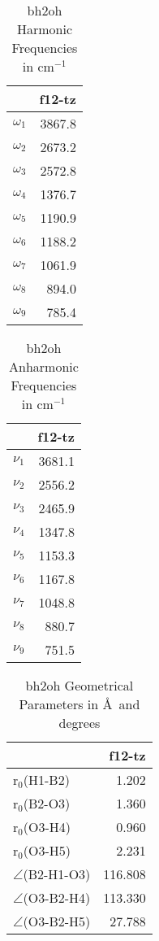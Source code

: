 \begin{table}
\centering
\caption{bh2oh Harmonic Frequencies in cm$^{-1}$}
\label{bh2oh_harm}
\begin{tabular}{lr}
\toprule
 & f12-tz \\
\midrule
$\omega_{1}$ & 3867.8 \\
$\omega_{2}$ & 2673.2 \\
$\omega_{3}$ & 2572.8 \\
$\omega_{4}$ & 1376.7 \\
$\omega_{5}$ & 1190.9 \\
$\omega_{6}$ & 1188.2 \\
$\omega_{7}$ & 1061.9 \\
$\omega_{8}$ & 894.0 \\
$\omega_{9}$ & 785.4 \\
\bottomrule
\end{tabular}
\end{table}
\begin{table}
\centering
\caption{bh2oh Anharmonic Frequencies in cm$^{-1}$}
\label{bh2oh_anharm}
\begin{tabular}{lr}
\toprule
 & f12-tz \\
\midrule
$\nu_{1}$ & 3681.1 \\
$\nu_{2}$ & 2556.2 \\
$\nu_{3}$ & 2465.9 \\
$\nu_{4}$ & 1347.8 \\
$\nu_{5}$ & 1153.3 \\
$\nu_{6}$ & 1167.8 \\
$\nu_{7}$ & 1048.8 \\
$\nu_{8}$ & 880.7 \\
$\nu_{9}$ & 751.5 \\
\bottomrule
\end{tabular}
\end{table}
\begin{table}
\centering
\caption{bh2oh Geometrical Parameters in \AA~and degrees}
\label{bh2oh_geos}
\begin{tabular}{lr}
\toprule
 & f12-tz \\
\midrule
r$_0$(H1-B2) & 1.202 \\
r$_0$(B2-O3) & 1.360 \\
r$_0$(O3-H4) & 0.960 \\
r$_0$(O3-H5) & 2.231 \\
$\angle$(B2-H1-O3) & 116.808 \\
$\angle$(O3-B2-H4) & 113.330 \\
$\angle$(O3-B2-H5) & 27.788 \\
\bottomrule
\end{tabular}
\end{table}
